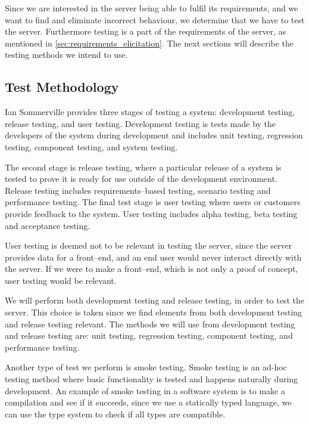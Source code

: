 Since we are interested in the server being able to fulfil its requirements, 
and we want to find and eliminate incorrect behaviour, we determine that we have to test the server.
Furthermore testing is a part of the requirements of the server, as mentioned in \cref{sec:requirements_elicitation}.
The next sections will describe the testing methods we intend to use.

\subsection{Test Methodology}
Ian Sommerville provides three stages of testing a system\cite[p.~231]{software_engineering}:
development testing, release testing, and user testing.
Development testing is tests made by the developers of the system during development 
and includes unit testing, regression testing, component testing, 
and system testing\cite[p.~232]{software_engineering}.

The second stage is release testing, 
where a particular release of a system is tested to prove it is ready for use outside of the development environment\cite[p.~245]{software_engineering}.
Release testing includes requirements--based testing, scenario testing and performance testing.
The final test stage is user testing where users or customers provide feedback to the system.\cite[p.~249]{software_engineering}
User testing includes alpha testing, beta testing and acceptance testing.

User testing is deemed not to be relevant in testing the server, 
since the server provides data for a front--end,
and an end user would never interact directly with the server.
If we were to make a front--end, which is not only a proof of concept, user testing would be relevant.

We will perform both development testing and release testing, in order to test the server.
This choice is taken since we find elements from both development testing and release testing relevant.
The methods we will use from development testing and release testing are:
unit testing, regression testing, component testing, and performance testing.

\bigskip

Another type of test we perform is smoke testing.
Smoke testing is an ad-hoc testing method where basic functionality is tested and happens naturally during development\cite{smoke_testing}.
An example of smoke testing in a software system is to make a compilation and see if it succeeds, since we use a statically typed language,
we can use the type system to check if all types are compatible.


